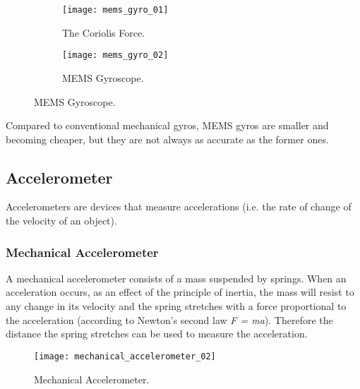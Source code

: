 \begin{figure}[htb]
 \centering
	\begin{subfigure}{0.45\textwidth}
		\texttt{[image: mems\_gyro\_01]}
		\caption{The Coriolis Force.}
	\end{subfigure}\hfil
	\begin{subfigure}{0.45\textwidth}
		\texttt{[image: mems\_gyro\_02]}
		\caption{MEMS Gyroscope.}
	\end{subfigure}
\end{figure}

Compared to conventional mechanical gyros, MEMS gyros are smaller and becoming cheaper, but they are not always as accurate as the former ones.




\subsection{Accelerometer}

Accelerometers are devices that measure accelerations (i.e. the rate of change of the velocity of an object).

\subsubsection{Mechanical Accelerometer}

A mechanical accelerometer consists of a mass suspended by springs. When an acceleration occurs, as an effect of the principle of inertia, the mass will resist to any change in its velocity and the spring stretches with a force proportional to the acceleration (according to Newton's second law \textit{F = ma}). Therefore the distance the spring stretches can be used to measure the acceleration.

\begin{figure}[!ht]
	\texttt{[image: mechanical\_accelerometer\_02]}
	\captionsetup{justification=centering, margin=1.5cm}
	\centering
	\caption{Mechanical Accelerometer.}
	\centering
\end{figure}

